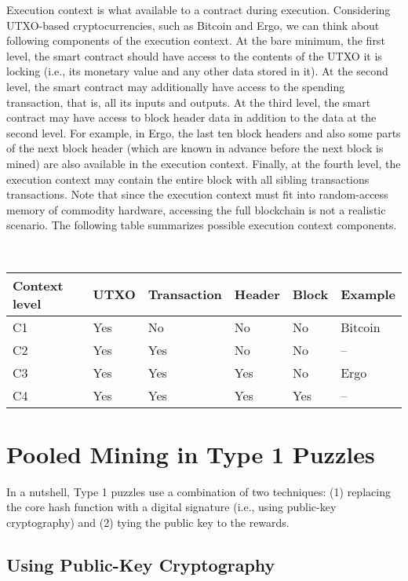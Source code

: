 \documentclass[runningheads]{llncs}
\begin{document}
Execution context is what available to a contract during execution. Considering UTXO-based cryptocurrencies, such as
Bitcoin and Ergo, we can think about following components of the execution context. At the bare minimum, the first level, the smart contract 
 should have access to the contents of the UTXO it is locking (i.e., its monetary value and any other data stored in it). At the second level, the smart contract may additionally have access to the spending transaction, that is, all its inputs and outputs. At the third level, the smart contract may have access to block header data in addition to the data at the second level. For example, in Ergo, the last ten block headers and also some parts of the next block header 
 (which are known in advance before the next block is mined) are also available in the execution context. Finally, at the fourth level, the execution context may contain the entire block with all sibling transactions transactions. Note that since the execution context must fit into random-access memory of commodity hardware, accessing the full blockchain is not a realistic scenario. The following
 table summarizes possible execution context components.

~\\
\begin{tabular}{|l|l|l|l|l|l|}\hline
	Context level & UTXO & Transaction & Header      & Block & Example \\ \hline
	 C1     & Yes  & No          & No  		   & No    & Bitcoin~\cite{Nak08} \\
	 C2     & Yes & Yes         & No 		   & No    & -- \\
	 C3     & Yes & Yes         & Yes 		   & No    & Ergo ~\cite{ergo}   \\
	 C4     & Yes & Yes         & Yes 		   & Yes   & --    \\\hline
\end{tabular}
	
\section{Pooled Mining in Type 1 Puzzles}
\label{bypasstype1}

In a nutshell, Type 1 puzzles use a combination of two techniques: (1) replacing the core hash function with a digital signature (i.e., using public-key cryptography) and (2) tying the public key to the rewards.

\subsection{Using Public-Key Cryptography}
\end{document}
